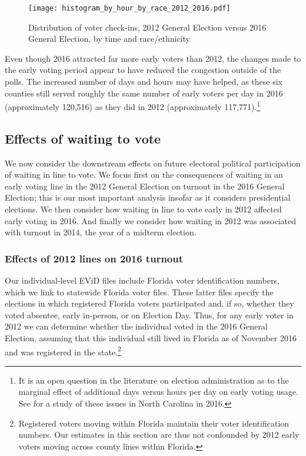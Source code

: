 \documentclass[12pt,titlepage]{article}
\begin{document}
\begin{figure}[!ht]
  \caption{Distribution of voter check-ins, 2012 General Election
    versus 2016 General Election, by time and race/ethnicity}
  \label{fig:race2012and2016}
  \centering
  \centering\texttt{[image: histogram\_by\_hour\_by\_race\_2012\_2016.pdf]}
\end{figure}

Even though 2016 attracted far more early voters than 2012, the
changes made to the early voting period appear to have reduced the
congestion outside of the polls. The increased number of days and
hours may have helped, as these six counties still served roughly the
same number of early voters per day in 2016 (approximately 120,516) as
they did in 2012 (approximately 117,771).\footnote{It is an open
  question in the literature on election administration as to the
  marginal effect of additional days versus hours per day on early
  voting usage.  See \citet{walkeretal:ncearly} for a study of these
  issues in North Carolina in 2016.}



\subsection*{Effects of waiting to vote}

We now consider the downstream effects on future electoral political
participation of waiting in line to vote.  We focus first on the
consequences of waiting in an early voting line in the 2012 General
Election on turnout in the 2016 General Election; this is our most
important analysis insofar as it considers presidential elections.  We
then consider how waiting in line to vote early in 2012 affected early
voting in 2016.  And finally we consider how waiting in 2012 was
associated with turnout in 2014, the year of a midterm election.

\subsubsection*{Effects of 2012 lines on 2016 turnout}

Our individual-level EViD files include Florida voter identification
numbers, which we link to statewide Florida voter files.  These latter
files specify the elections in which registered Florida voters
participated and, if so, whether they voted absentee, early in-person,
or on Election Day.  Thus, for any early voter in 2012 we can
determine whether the individual voted in the 2016 General Election,
assuming that this individual still lived in Florida as of November
2016 and was registered in the state.\footnote{Registered voters
  moving within Florida maintain their voter identification numbers.
  Our estimates in this section are thus not confounded by 2012 early
  voters moving across county lines within Florida.}
\end{document}
